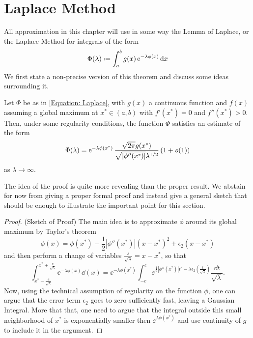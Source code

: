 \section{Laplace Method}

All approximation in this chapter will use in some way the Lemma of Laplace, or the Laplace Method for integrals of the form
\begin{equation}
	\Phi(\lambda) \deff \int_{a}^{b} g(x) \ee^{-\lambda \phi(x)} \dd x
	\label{Equation: Laplace}
\end{equation}
We first state a non-precise version of this theorem and discuss some ideas surrounding it.
\begin{thm}
	Let $\Phi$ be as in \eqref{Equation: Laplace}, with $g(x)$ a continuous function and $f(x)$ assuming a global maximum at $x^* \in (a,b)$ with $f'(x^*) = 0$ and $f''(x^*) > 0$. Then, under some regularity conditions, the function $\Phi$ satisfies an estimate of the form
	\begin{equation}
		\Phi(\lambda) = \operatorname{e}^{-\lambda \phi(x^*)} \frac{\sqrt{2\pi} g(x^*)}{\sqrt{|\phi''(x^*)|}\lambda^{1/2}} \left( 1 + \mathit{o}(1)\right)
	\end{equation}
	as $\lambda \rightarrow \infty$.
	\label{Prop: Non-formal Laplace's Method}
\end{thm}

The idea of the proof is quite more revealing than the proper result. We abstain for now from giving a proper formal proof and instead give a general sketch that should be enough to illustrate the important point for this section.

\begin{proof}
	(Sketch of Proof) The main idea is to approximate $\phi$ around its global maximum by Taylor's theorem 
	\begin{equation}
		\phi(x) = \phi(x^*) - \frac{1}{2} |\phi''(x^*)|(x-x^*)^2 + \epsilon_2(x-x^*)
	\end{equation}
	and then perform a change of variables $\frac{s}{\sqrt{\lambda}} = x - x^*$, so that 
	\begin{equation}
		\int_{x^*-\frac{c}{\sqrt{\lambda}}}^{x^*+\frac{c}{\sqrt{\lambda}}} \ee^{-\lambda \phi(x)} \dd(x) = \ee^{-\lambda \phi(x^*)} \int_{-c}^c \ee^{\frac{1}{2} |\phi''(x^*)|t^2 - \lambda \epsilon_2\left(\frac{t}{\sqrt{\lambda}}\right)} \frac{\dd t}{\sqrt{\lambda}}.
	\end{equation}
	Now, using the technical assumption of regularity on the function $\phi$, one can argue that the error term $\epsilon_2$ goes to zero sufficiently fast, leaving a Gaussian Integral. More that that, one need to argue that the integral outside this small neighborhood of $x^*$ is exponentially smaller then $\ee^{\lambda \phi(x^*)}$ and use continuity of $g$ to include it in the argument.
\end{proof}

